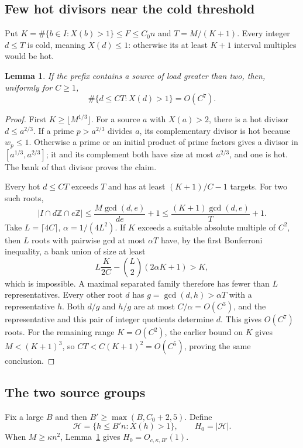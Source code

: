 \documentclass[11pt,a4paper]{article}
\newtheorem{lemma}[theorem]{Lemma}
\begin{document}
\subsection{Few hot divisors near the cold threshold}
Put $K=\#\{b\in I:X(b)>1\}\le F\le C_0n$ and $T=M/(K+1)$.
Every integer $d\le T$ is cold, meaning $X(d)\le1$: otherwise its
at least $K+1$ interval multiples would be hot.

\begin{lemma}\label{lem:packing}
If the prefix contains a source of load greater than two, then,
uniformly for $C\ge1$,
\[
 \#\{d\le CT:X(d)>1\}=O(C^7).
\]
\end{lemma}
\begin{proof}
First $K\ge\lfloor M^{1/3}\rfloor$. For a source $a$ with $X(a)>2$,
there is a hot divisor $d\le a^{2/3}$. If a prime $p>a^{2/3}$ divides
$a$, its complementary divisor is hot because $w_p\le1$. Otherwise a
prime or an initial product of prime factors gives a divisor in
$[a^{1/3},a^{2/3}]$; it and its complement both have size at most
$a^{2/3}$, and one is hot. The bank of that divisor proves the claim.

Every hot $d\le CT$ exceeds $T$ and has at least $(K+1)/C-1$ targets.
For two such roots,
\[
 |I\cap d\mathbb Z\cap e\mathbb Z|
 \le\frac{M\gcd(d,e)}{de}+1
 \le\frac{(K+1)\gcd(d,e)}T+1.
\]
Take $L=\lceil4C\rceil$, $\alpha=1/(4L^2)$. If $K$ exceeds a
suitable absolute multiple of $C^2$, then $L$ roots with pairwise
gcd at most $\alpha T$ have, by the first Bonferroni inequality, a
bank union of size at least
\[
 L\frac{K}{2C}-\binom L2(2\alpha K+1)>K,
\]
which is impossible. A maximal separated family therefore has fewer
than $L$ representatives. Every other root $d$ has
$g=\gcd(d,h)>\alpha T$ with a representative $h$. Both $d/g$ and
$h/g$ are at most $C/\alpha=O(C^3)$, and the representative and this
pair of integer quotients determine $d$. This gives $O(C^7)$ roots.
For the remaining range $K=O(C^2)$, the earlier bound on $K$ gives
$M<(K+1)^3$, so $CT<C(K+1)^2=O(C^5)$, proving the same conclusion.
\end{proof}

\subsection{The two source groups}
Fix a large $B$ and then
$B'\ge\max(B,C_0+2,5)$. Define
\[
 \mathcal H=\{h\le B'n:X(h)>1\},\qquad H_0=|\mathcal H|.
\]
When $M\ge\kappa n^2$, Lemma~\ref{lem:packing} gives
$H_0=O_{c,\kappa,B'}(1)$.
\end{document}
